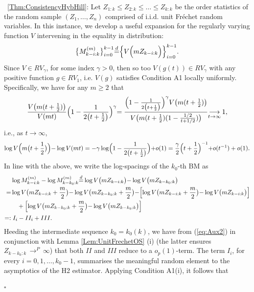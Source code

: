 \documentclass[11pt, a4paper, oneside]{article}
\numberwithin{equation}{section}
\theoremstyle{plain}
\theoremstyle{definition}
\newenvironment{pfofThm}{\noindent{\bf Proof of Theorem}}{\hfill $\square$ \\}
\newcommand{\id}{\ensuremath{\displaystyle{\mathop {=} ^d}}}
\newcommand{\arrowf}[1]{\ensuremath{\displaystyle {\mathop {\longrightarrow}_{#1 \rightarrow \infty}\,}}}
\newcommand{\conv}[1]{\ensuremath{\, \displaystyle {\mathop{\longrightarrow}^{#1}}}\, }
\begin{document}
\begin{pfofThm}~\ref{Thm:ConsistencyHybHill}:
Let  $Z_{1:k} \leq Z_{2:k}\leq \ldots \leq Z_{k:k}$ be the order statistics of the random sample $(Z_{1},\ldots,Z_{n})$ comprised of i.i.d. unit  Fr\'{e}chet random variables. In this instance, we develop a useful expansion for the regularly varying function $V$ intervening in the equality in distribution: \begin{equation*}
   \bigl\{ M^{(m)}_{k-i:k}\bigr\}_{i=0}^{k-1} \id \Bigl\{ V\Bigl(mZ_{k-i:k}\Bigr) \Bigr\}_{i=0}^{k-1}.
 \end{equation*}
Since $V \in RV_{\gamma}$, for some index $\gamma >0$, then so too $V(g(t))\in RV_{\gamma}$ with any positive function $g\in RV_{1}$, i.e. $V(g)$ satisfies Condition A1 locally uniformly. Specifically, we have for any $m\geq 2$ that
\begin{equation*}
  \frac{V\bigl(m(t+\frac{1}{2})\bigl)}{V(mt)} \Bigl(1-\frac{1}{2\bigl(t+\frac{1}{2}\bigl)}\Bigl)^{\gamma} =\frac{\Bigl(1-\frac{1}{2\bigl(t+\frac{1}{2}\bigl)}\Bigl)^{\gamma}V\bigl(m(t+\frac{1}{2})\bigl) }{V\bigl(m(t+\frac{1}{2}) (1-\frac{1/2}{t+1/2} )\bigl)}
  \arrowf{t} 1,
\end{equation*}
i.e., as $t \rightarrow \infty$,
\begin{equation}\label{eq:Aux2}
    \log V\Bigl(m\bigr(t+\frac{1}{2}\bigl)\Bigl)-\log V(mt)=-\gamma\log\Bigl(1-\frac{1}{2\bigl(t+\frac{1}{2}\bigl)}\Bigl)+o(1) =\frac{\gamma}{2}\Bigl(t+\frac{1}{2}\Bigl)^{-1} +o(t^{-1})+o(1).
\end{equation}
In line with the above, we write the log-spacings of the $k_0$-th BM as
 \begin{align*}
 	& \log M^{(m)}_{k-i:k} - \log M^{(m)}_{k-k_{0}:k}
 	\id \log V\bigl(mZ_{k-i:k}\bigl)-\log V\bigl(mZ_{k-k_{0}:k}\bigl)\\
   =& \log V\bigl(mZ_{k-i:k}+\frac{m}{2}\bigl)-\log V\bigl(mZ_{k-k_{0}:k}+\frac{m}{2}\bigl) -\Bigl[\log V\bigl(mZ_{k-i:k}
   +\frac{m}{2}\bigl)-\log V\bigl(mZ_{k-i:k}\bigl)\Bigl]\\
   & \quad +\Bigl[\log V\bigl(mZ_{k-k_{0}:k}+\frac{m}{2}\bigl)-\log V\bigl(mZ_{k-k_{0}:k}\bigl)\Bigl]\\
   =:&\;  I_{i} -II_{i} + III. 
\end{align*}
Heeding the intermediate sequence $k_{0}= k_0(k)$, we have from (\ref{eq:Aux2}) in conjunction with Lemma \ref{Lem:UnitFrechetOS} (i) (the latter ensures $Z_{k-k_{0}:k}\conv{P}\infty$) that both $II$ and $III$ reduce to a $o_{p}(1)$-term. The term $I_{i}$, for every $i=0, 1, \ldots, k_0-1$, summarises the meaningful random element to the asymptotics of the H2 estimator. Applying Condition A1(i), it follows that

\end{pfofThm}
\end{document}
